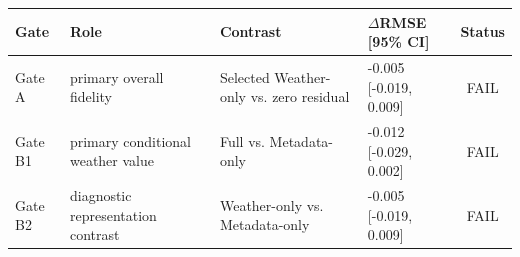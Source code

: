 \begin{tabular}{p{}p{}p{}p{}c}
\toprule
Gate & Role & Contrast & $\Delta$RMSE [95\% CI] & Status \\
\midrule
Gate A & primary overall fidelity & Selected Weather-only vs. zero residual & -0.005 [-0.019, 0.009] & FAIL \\
Gate B1 & primary conditional weather value & Full vs. Metadata-only & -0.012 [-0.029, 0.002] & FAIL \\
Gate B2 & diagnostic representation contrast & Weather-only vs. Metadata-only & -0.005 [-0.019, 0.009] & FAIL \\
\bottomrule
\end{tabular}
